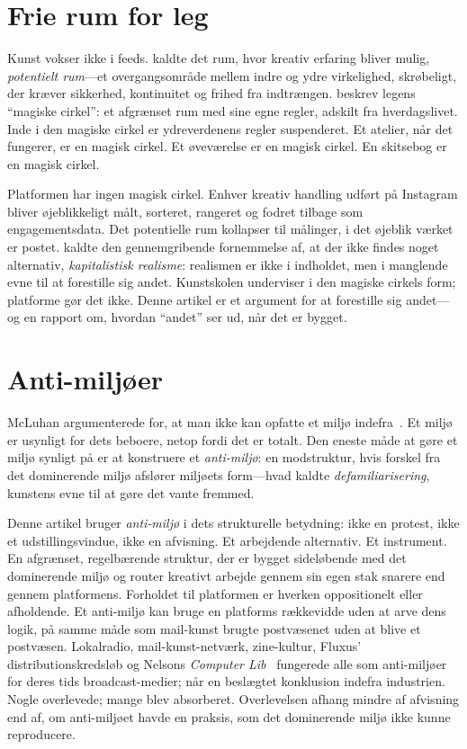 \documentclass[10pt,letterpaper,twocolumn]{article}
\begin{document}
\section{Frie rum for leg}

Kunst vokser ikke i feeds. \citet{winnicott1971playing} kaldte det rum, hvor kreativ erfaring bliver mulig, \emph{potentielt rum}---et overgangsområde mellem indre og ydre virkelighed, skrøbeligt, der kræver sikkerhed, kontinuitet og frihed fra indtrængen. \citet{huizinga1938homo} beskrev legens ``magiske cirkel'': et afgrænset rum med sine egne regler, adskilt fra hverdagslivet. Inde i den magiske cirkel er ydreverdenens regler suspenderet. Et atelier, når det fungerer, er en magisk cirkel. Et øveværelse er en magisk cirkel. En skitsebog er en magisk cirkel.

Platformen har ingen magisk cirkel. Enhver kreativ handling udført på Instagram bliver øjeblikkeligt målt, sorteret, rangeret og fodret tilbage som engagementsdata. Det potentielle rum kollapser til målinger, i det øjeblik værket er postet. \citet{fisher2009capitalist} kaldte den gennemgribende fornemmelse af, at der ikke findes noget alternativ, \emph{kapitalistisk realisme}: realismen er ikke i indholdet, men i manglende evne til at forestille sig andet. Kunstskolen underviser i den magiske cirkels form; platforme gør det ikke. Denne artikel er et argument for at forestille sig andet---og en rapport om, hvordan ``andet'' ser ud, når det er bygget.

\section{Anti-milj{\o}er}

McLuhan argumenterede for, at man ikke kan opfatte et miljø indefra~\citep{mcluhan1964understanding, mcluhan1969playboy}. Et miljø er usynligt for dets beboere, netop fordi det er totalt. Den eneste måde at gøre et miljø synligt på er at konstruere et \emph{anti-miljø}: en modstruktur, hvis forskel fra det dominerende miljø afslører miljøets form---hvad \citet{shklovsky1917art} kaldte \emph{defamiliarisering}, kunstens evne til at gøre det vante fremmed.

Denne artikel bruger \emph{anti-miljø} i dets strukturelle betydning: ikke en protest, ikke et udstillingsvindue, ikke en afvisning. Et arbejdende alternativ. Et instrument. En afgrænset, regelbærende struktur, der er bygget sideløbende med det dominerende miljø og router kreativt arbejde gennem sin egen stak snarere end gennem platformens. Forholdet til platformen er hverken oppositionelt eller afholdende. Et anti-miljø kan bruge en platforms rækkevidde uden at arve dens logik, på samme måde som mail-kunst brugte postvæsenet uden at blive et postvæsen. Lokalradio, mail-kunst-netværk, zine-kultur, Fluxus' distributionskredsløb og Nelsons \emph{Computer Lib}~\citep{nelson1974computerlib} fungerede alle som anti-miljøer for deres tids broadcast-medier; \citet{lanier2018ten} når en beslægtet konklusion indefra industrien. Nogle overlevede; mange blev absorberet. Overlevelsen afhang mindre af afvisning end af, om anti-miljøet havde en praksis, som det dominerende miljø ikke kunne reproducere.
\end{document}
